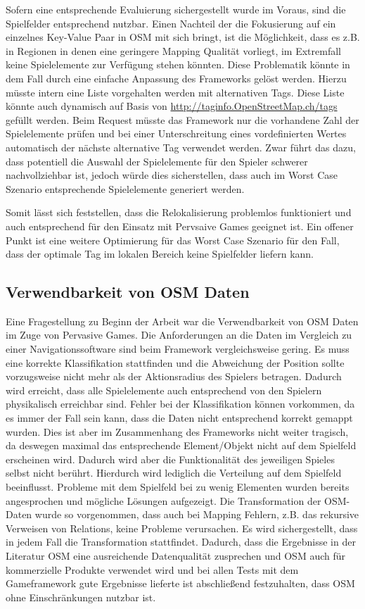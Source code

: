 Sofern eine entsprechende Evaluierung sichergestellt wurde im Voraus, sind die Spielfelder entsprechend nutzbar.
Einen Nachteil der die Fokusierung auf ein einzelnes Key-Value Paar in OSM mit sich bringt, ist die Möglichkeit, dass es z.B. in Regionen in denen eine geringere Mapping Qualität vorliegt, im Extremfall keine Spielelemente zur Verfügung stehen könnten. Diese Problematik könnte in dem Fall durch eine einfache Anpassung des Frameworks gelöst werden. Hierzu müsste intern eine Liste vorgehalten werden mit alternativen Tags. Diese Liste könnte auch dynamisch auf Basis von \url{http://taginfo.OpenStreetMap.ch/tags} gefüllt werden. Beim Request müsste das Framework nur die vorhandene Zahl der Spielelemente prüfen und bei einer Unterschreitung eines vordefinierten Wertes automatisch der nächste alternative Tag verwendet werden. Zwar führt das dazu, dass potentiell die Auswahl der Spielelemente für den Spieler schwerer nachvollziehbar ist, jedoch würde dies sicherstellen, dass auch im Worst Case Szenario entsprechende Spielelemente generiert werden.

Somit lässt sich feststellen, dass die Relokalisierung problemlos funktioniert und auch entsprechend für den Einsatz mit Pervsaive Games geeignet ist. Ein offener Punkt ist eine weitere Optimierung für das Worst Case Szenario für den Fall, dass der optimale Tag im lokalen Bereich keine Spielfelder liefern kann.

\subsection*{Verwendbarkeit von OSM Daten}

Eine Fragestellung zu Beginn der Arbeit war die Verwendbarkeit von OSM Daten im Zuge von Pervasive Games.
Die Anforderungen an die Daten im Vergleich zu einer Navigationssoftware sind beim Framework vergleichsweise gering.
Es muss eine korrekte Klassifikation stattfinden und die Abweichung der Position sollte vorzugsweise nicht mehr als der Aktionsradius des Spielers betragen. Dadurch wird erreicht, dass alle Spielelemente auch entsprechend von den Spielern physikalisch erreichbar sind.
Fehler bei der Klassifikation können vorkommen, da es immer der Fall sein kann, dass die Daten nicht entsprechend korrekt gemappt wurden.
Dies ist aber im Zusammenhang des Frameworks nicht weiter tragisch, da deswegen maximal das entsprechende Element/Objekt nicht auf dem Spielfeld erscheinen wird. Dadurch wird aber die Funktionalität des jeweiligen Spieles selbst nicht berührt. Hierdurch wird lediglich die Verteilung auf dem Spielfeld beeinflusst. Probleme mit dem Spielfeld bei zu wenig Elementen wurden bereits angesprochen und mögliche Lösungen aufgezeigt.
Die Transformation der OSM-Daten wurde so vorgenommen, dass auch bei Mapping Fehlern, z.B. das rekursive Verweisen von Relations, keine Probleme verursachen. Es wird sichergestellt, dass in jedem Fall die Transformation stattfindet.
Dadurch, dass die Ergebnisse in der Literatur OSM eine ausreichende Datenqualität zusprechen und OSM auch für kommerzielle Produkte verwendet wird und bei allen Tests mit dem Gameframework gute Ergebnisse lieferte ist abschließend festzuhalten, dass OSM ohne Einschränkungen nutzbar ist.

